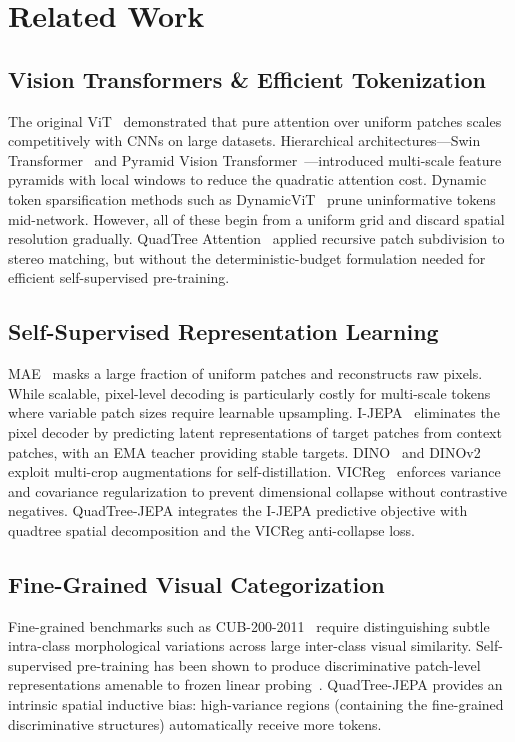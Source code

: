 \documentclass[10pt,twocolumn,letterpaper]{article}
\begin{document}
\section{Related Work}
\label{sec:related}

\subsection{Vision Transformers \& Efficient Tokenization}
The original ViT~\cite{dosovitskiy2020image} demonstrated that pure attention over uniform patches scales competitively with CNNs on large datasets. Hierarchical architectures—Swin Transformer~\cite{liu2021swin} and Pyramid Vision Transformer~\cite{wang2021pyramid}—introduced multi-scale feature pyramids with local windows to reduce the quadratic attention cost. Dynamic token sparsification methods such as DynamicViT~\cite{rao2021dynamicvit} prune uninformative tokens mid-network. However, all of these begin from a uniform grid and discard spatial resolution gradually. QuadTree Attention~\cite{tang2022quadtree} applied recursive patch subdivision to stereo matching, but without the deterministic-budget formulation needed for efficient self-supervised pre-training.

\subsection{Self-Supervised Representation Learning}
MAE~\cite{he2022masked} masks a large fraction of uniform patches and reconstructs raw pixels. While scalable, pixel-level decoding is particularly costly for multi-scale tokens where variable patch sizes require learnable upsampling. I-JEPA~\cite{assran2023self} eliminates the pixel decoder by predicting latent representations of target patches from context patches, with an EMA teacher providing stable targets. DINO~\cite{caron2021emerging} and DINOv2~\cite{oquab2023dinov2} exploit multi-crop augmentations for self-distillation. VICReg~\cite{bardes2022vicreg} enforces variance and covariance regularization to prevent dimensional collapse without contrastive negatives. QuadTree-JEPA integrates the I-JEPA predictive objective with quadtree spatial decomposition and the VICReg anti-collapse loss.

\subsection{Fine-Grained Visual Categorization}
Fine-grained benchmarks such as CUB-200-2011~\cite{wah2011caltech} require distinguishing subtle intra-class morphological variations across large inter-class visual similarity. Self-supervised pre-training has been shown to produce discriminative patch-level representations amenable to frozen linear probing~\cite{oquab2023dinov2}. QuadTree-JEPA provides an intrinsic spatial inductive bias: high-variance regions (containing the fine-grained discriminative structures) automatically receive more tokens.
\end{document}
